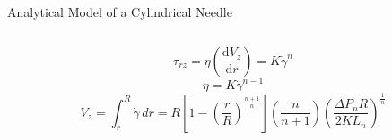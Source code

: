 \begin{frame}{Analytical Model of a Cylindrical Needle}
\begin{columns}
\begin{column}{.6\textwidth}
\begin{column}{.6\textwidth}
\end{column}
\vspace{-0.2cm}
\begin{equation*}
\tau_{rz} = \eta (\frac{\mathrm{d}V_z}{\mathrm{d}r}) = K\dot{\gamma}^n
\end{equation*}
\vspace{-0.55cm}
\begin{equation*}
\eta = K\dot{\gamma}^{n-1}
\end{equation*}
\vspace{-0.55cm}
\begin{equation*}
V_z = \int_{r}^{R} \dot{\gamma} \,dr = R[1-(\frac{r}{R})^{\frac{n+1}{n}}](\frac{n}{n+1})(\frac{\Delta P_n R}{2KL_n})^{\frac{1}{n}}
\end{equation*}
\end{column}
\end{columns}

\end{frame}


